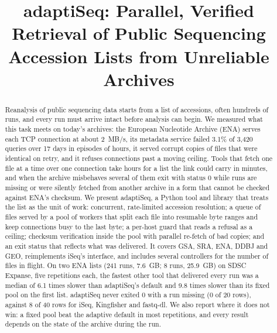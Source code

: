 \documentclass[conference]{IEEEtran}
\begin{document}
\title{adaptiSeq: Parallel, Verified Retrieval of Public Sequencing Accession Lists from Unreliable Archives}

\author{
}

\maketitle

\begin{abstract}
Reanalysis of public sequencing data starts from a list of accessions, often hundreds of runs, and every run must arrive intact before analysis can begin. We measured what this task meets on today's archives: the European Nucleotide Archive (ENA) serves each TCP connection at about 2~MB/s, its metadata service failed 3.1\% of 3,420 queries over 17 days in episodes of hours, it served corrupt copies of files that were identical on retry, and it refuses connections past a moving ceiling. Tools that fetch one file at a time over one connection take hours for a list the link could carry in minutes, and when the archive misbehaves several of them exit with status 0 while runs are missing or were silently fetched from another archive in a form that cannot be checked against ENA's checksum. We present adaptiSeq, a Python tool and library that treats the list as the unit of work: concurrent, rate-limited accession resolution; a queue of files served by a pool of workers that split each file into resumable byte ranges and keep connections busy to the last byte; a per-host guard that reads a refusal as a ceiling; checksum verification inside the pool with parallel re-fetch of bad copies; and an exit status that reflects what was delivered. It covers GSA, SRA, ENA, DDBJ and GEO, reimplements iSeq's interface, and includes several controllers for the number of files in flight. On two ENA lists (241 runs, 7.6~GB; 8 runs, 25.9~GB) on SDSC Expanse, five repetitions each, the fastest other tool that delivered every run was a median of 6.1 times slower than adaptiSeq's default and 9.8 times slower than its fixed pool on the first list. adaptiSeq never exited 0 with a run missing (0 of 20 rows), against 8 of 40 rows for iSeq, Kingfisher and fastq-dl. We also report where it does not win: a fixed pool beat the adaptive default in most repetitions, and every result depends on the state of the archive during the run.
\end{abstract}
\end{document}
